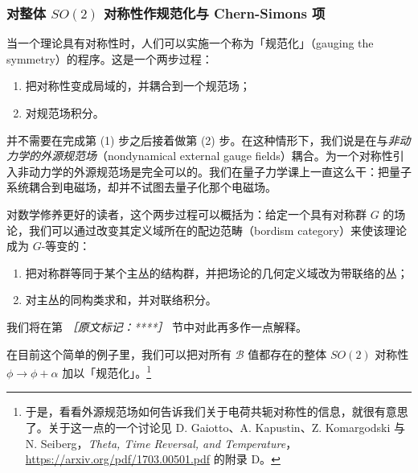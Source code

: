 \subsubsection{对整体 $SO(2)$ 对称性作规范化与 Chern-Simons 项} %


当一个理论具有对称性时，人们可以实施一个称为「规范化」（gauging the symmetry）的程序。这是一个两步过程：

\begin{enumerate}
  \item 把对称性变成局域的，并耦合到一个规范场；
  \item 对规范场积分。
\end{enumerate}

并不需要在完成第 (1) 步之后接着做第 (2) 步。在这种情形下，我们说是在与\emph{非动力学的外源规范场}（nondynamical external gauge fields）耦合。为一个对称性引入非动力学的外源规范场是完全可以的。我们在量子力学课上一直这么干：把量子系统耦合到电磁场，却并不试图去量子化那个电磁场。

对数学修养更好的读者，这个两步过程可以概括为：给定一个具有对称群 $G$ 的场论，我们可以通过改变其定义域所在的配边范畴（bordism category）来使该理论成为 $G$-等变的：

\begin{enumerate}
  \item 把对称群等同于某个主丛的结构群，并把场论的几何定义域改为带联络的丛；
  \item 对主丛的同构类求和，并对联络积分。
\end{enumerate}

我们将在第 {\small\itshape ［原文标记：****］}%
节中对此再多作一点解释。

在目前这个简单的例子里，我们可以把对所有 $\mathcal{B}$ 值都存在的整体 $SO(2)$ 对称性 $\phi\to\phi+\alpha$ 加以「规范化」。\footnote{于是，看看外源规范场如何告诉我们关于电荷共轭对称性的信息，就很有意思了。关于这一点的一个讨论见 D. Gaiotto、A. Kapustin、Z. Komargodski 与 N. Seiberg，\emph{Theta, Time Reversal, and Temperature}，\url{https://arxiv.org/pdf/1703.00501.pdf} 的附录 D。}


